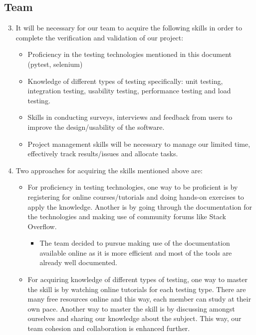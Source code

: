 \documentclass[12pt, titlepage]{article}
\begin{document}
\subsection*{Team}

\begin{enumerate}
\setcounter{enumi}{2}
    \item It will be necessary for our team to acquire the following skills in order to complete the verification and validation of our project:
    \begin{itemize}
        \item Proficiency in the testing technologies mentioned in this document (pytest, selenium)
        \item Knowledge of different types of testing specifically: unit testing, integration testing, usability testing, performance testing and load testing.
        \item Skills in conducting surveys, interviews and feedback from users to improve the design/usability of the software.
        \item Project management skills will be necessary to manage our limited time, effectively track results/issues and allocate tasks.
    \end{itemize}
    \item Two approaches for acquiring the skills mentioned above are:
    \begin{itemize}
        \item For proficiency in testing technologies, one way to be proficient is by registering for online courses/tutorials and doing hands-on exercises to apply the knowledge. Another is by going through the documentation for the technologies and making use of community forums like Stack Overflow. 
        \begin{itemize}
            \item The team decided to pursue making use of the documentation available online as it is more efficient and most of the tools are already well documented.
        \end{itemize}
        \item For acquiring knowledge of different types of testing, one way to master the skill is by watching online tutorials for each testing type. There are many free resources online and this way, each member can study at their own pace. Another way to master the skill is by discussing amongst ourselves and sharing our knowledge about the subject. This way, our team cohesion and collaboration is enhanced further.

\end{itemize}
\end{enumerate}
\end{document}
